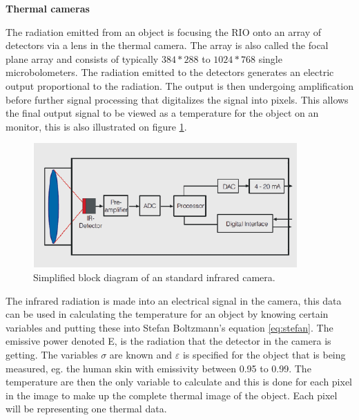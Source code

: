 \textbf{Thermal cameras} \label{sec:cam}

The radiation emitted from an object is focusing the RIO onto an array of detectors via a lens in the thermal camera. The array is also called the focal plane array and consists of typically $384 * 288$ to $1024 * 768$ single microbolometers.\cite{olbrycht2015} The radiation emitted to the detectors generates an electric output proportional to the radiation. The output is then undergoing amplification before further signal processing that digitalizes the signal into pixels. This allows the final output signal to be viewed as a temperature for the object on an monitor, this is also illustrated on figure \ref{fig:em_spectrum}. \cite{optris2009}

\begin{figure}[H]                                         
	\includegraphics[width=.55\textwidth]{figures/IR_cam}  
	\caption{Simplified block diagram of an standard infrared camera.\cite{optris2009}}
	\label{fig:em_spectrum}  
\end{figure} 

The infrared radiation is made into an electrical signal in the camera, this data can be used in calculating the temperature for an object by knowing certain variables and putting these into Stefan Boltzmann's equation \ref{eq:stefan}. The emissive power denoted E, is the radiation that the detector in the camera is getting. The variables $\sigma$ are known and $\varepsilon$ is specified for the object that is being measured, eg. the human skin with emissivity between 0.95 to 0.99. The temperature are then the only variable to calculate and this is done for each pixel in the image to make up the complete thermal image of the object. Each pixel will be representing one thermal data. \cite{ignacio2017} 







